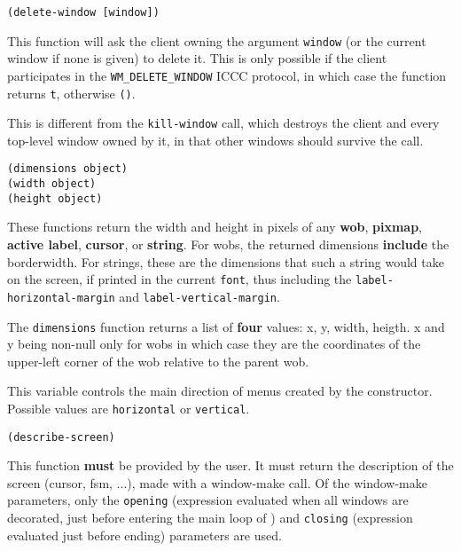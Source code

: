 
{\usagefont\begin{verbatim}
(delete-window [window])
\end{verbatim}}\usageupspace

This function will ask the client owning the argument \verb"window" (or the
current window if none is given) to delete it. This is only possible if the
client participates in the \verb"WM_DELETE_WINDOW" ICCC protocol, in which
case the function returns \verb"t", otherwise \verb"()".

This is different from the \verb"kill-window" call, which destroys the
client and every top-level window owned by it, in that other windows should
survive the call.


{\usagefont\begin{verbatim}
(dimensions object)
(width object)
(height object)
\end{verbatim}}\usageupspace

These functions return the width and height in pixels of any {\bf wob}, {\bf
pixmap}, {\bf active label}, {\bf cursor}, or {\bf string}.  For wobs, the
returned dimensions {\bf include} the borderwidth. For strings, these are the
dimensions that such a string would take on the screen, if printed in the
current {\tt font}, thus including the \verb"label-horizontal-margin" and
\verb"label-vertical-margin".

The \verb"dimensions" function returns a list of {\bf four} values: x, y,
width, heigth. x and y being non-null only for wobs in which case they are
the coordinates of the upper-left corner of the wob relative to the parent
wob.



This variable controls the main direction of menus created by the
 constructor. Possible values are \verb"horizontal"
or \verb"vertical".

        
{\usagefont\begin{verbatim}
(describe-screen)
\end{verbatim}}\usageupspace

This function {\bf must} be provided by the user. 
It must return the description of the screen (cursor, fsm, ...), made with a
window-make call. Of the window-make parameters, only the \verb"opening"
(expression evaluated when all windows are decorated, just before entering
the main loop of {\GWM}) and \verb"closing" (expression evaluated just before
ending) parameters are used. 


